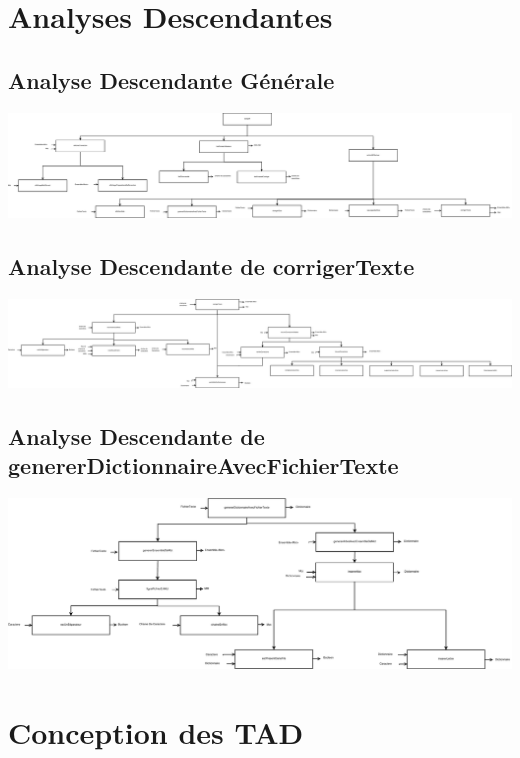 \documentclass{article}
\begin{document}
\clearpage
\section{Analyses Descendantes}
  \subsection{Analyse Descendante Générale}
  \includegraphics[width=1\textwidth]{AD/AnalyseDescendante.eps}
  \subsection{Analyse Descendante de corrigerTexte}
  \includegraphics[width=1\textwidth]{AD/corrigerTexte.eps}
  \subsection{Analyse Descendante de genererDictionnaireAvecFichierTexte}
  \includegraphics[width=1\textwidth]{AD/genererDictionnaireAvecFichierTexte.eps}

\clearpage
\section{Conception des TAD}
	
	
	\clearpage

	
	\clearpage

	
	\clearpage
\end{document}
